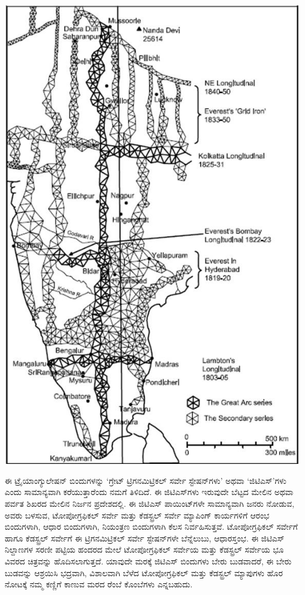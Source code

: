 \begin{center}
\includegraphics[scale=0.5]{"images/image004.jpg"}
\end{center}

ಈ ಟ್ರೈಯಾಂಗ್ಯುಲೇಷನ್​ ಬಿಂದುಗಳನ್ನು ‘ಗ್ರೇಟ್​ ಟ್ರಿಗನಮಿಟ್ರಿಕಲ್​ ಸರ್ವೇ ಸ್ಟೇಷನ್​\break ಗಳು’ ಅಥವಾ ‘ಜಿಟಿಎಸ್​’ಗಳು ಎಂದು ಸಾಮಾನ್ಯವಾಗಿ ಕರೆಯುತ್ತಾರೆಂದು ನಮಗೆ ತಿಳಿದಿದೆ. ಈ ಜಿಟಿಎಸ್​ಗಳು ಇರುವುದೇ ಬೆಟ್ಟದ ಮೇಲಿನ ಅಥವಾ ಪರ್ವತ ಶಿಖರದ ಮೇಲಿನ ನಿರ್ಜನ ಪ್ರದೇಶದಲ್ಲಿ. ಈ ಜಿಟಿಎಸ್​ ಪಾಯಿಂಟ್​ಗಳೇ ಸಾಮಾನ್ಯವಾಗಿ ಜನರು ನೋಡುವ, ಅವರು ಬಳಸುವ, ಟೋಪೋಗ್ರಫಿಕಲ್​ ಸರ್ವೇ ಮತ್ತು ಕೆಡಸ್ಟ್ರಲ್​ ಸರ್ವೇ ಮ್ಯಾಪಿಂಗ್​ ಕಾರ್ಯಗಳಿಗೆ ಆರಂಭ ಬಿಂದುಗಳಾಗಿ, ಆಧಾರ ಬಿಂದುಗಳಾಗಿ, ನಿಯಂತ್ರಣ ಬಿಂದುಗಳಾಗಿ ಕೆಲಸ ನಿರ್ವಹಿಸುತ್ತವೆ. ಟೋಪೋಗ್ರಫಿಕಲ್​ ಸರ್ವೇಗೆ ಹಾಗೂ ಕೆಡಸ್ಟ್ರಲ್​ ಸರ್ವೇಗೆ ಈ ಟ್ರಿಗನಮಿಟ್ರಿಕಲ್​ ಸರ್ವೇ ಸ್ಟೇಷನ್​ಗಳೇ ಬೆನ್ನೆಲುಬು, ಆಧಾರಸ್ತಂಭ. ಈ ಜಿಟಿಎಸ್​ ನಿಲ್ದಾಣಗಳ ಸರಣೀ ಪಟ್ಟಿಯ ಹಂದರದ ಮೇಲೆ ಟೋಪೋಗ್ರಫಿಕಲ್​ ಸರ್ವೇಯ ಮತ್ತು ಕೆಡಸ್ಟ್ರಲ್​ ಸರ್ವೇಯ ಭೂ ವಿವರದ ಚಿತ್ರವನ್ನು ಹೊದಿಸಲಾಗುತ್ತದೆ. ಯಾವುದೇ ಮರಕ್ಕೆ ಜಿಟಿಎಸ್​ ಬಿಂದುಗಳು ಬೇರು ಬುಡವಾದರೆ, ಈ ಬೇರು ಬುಡವನ್ನು ಆಶ್ರಯಿಸಿ ಭದ್ರವಾಗಿ, ವಿಶಾಲವಾಗಿ ಬೆಳೆದ ಟೋಪೋಗ್ರಫಿಕಲ್​ ಮತ್ತು ಕೆಡಸ್ಟ್ರಲ್​ ಮ್ಯಾಪುಗಳು ಹೊರ ನೋಟಕ್ಕೆ ನಮ್ಮ ಕಣ್ಣಿಗೆ ಕಾಣುವ ಮರದ ರೆಂಬೆ ಕೊಂಬೆಗಳು ಎನ್ನಬಹುದು.

